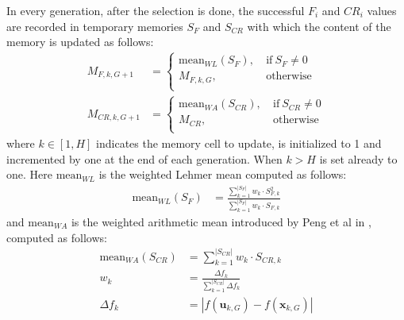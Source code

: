 In every generation, after the selection is done, the successful $F_{i}$ and $\textit{CR}_{i}$ values are recorded in temporary memories $S_{F}$ and $S_{\textit{CR}}$ with which the content of the memory is updated as follows:
\begin{align}
	M_{F,k,G+1} &= \begin{cases}
		\textrm{mean}_{\textit{WL}}(S_{F}),&\ \textrm{if}\ S_{F} \neq 0 \\
		M_{F,k,G},&\ \textrm{otherwise} \\
	\end{cases}\\
	M_{\textit{CR}, k, G + 1} &= \begin{cases}
		\textrm{mean}_{\textit{WA}}(S_{\textit{CR}}),&\ \textrm{if}\ S_{\textit{CR}} \neq 0 \\
		M_{\textit{CR}},&\ \textrm{otherwise} \\
	\end{cases}
\end{align}
where $k \in [1, H]$ indicates the memory cell to update, is initialized to 1 and incremented by one at the end of each generation. When $k > H$ is set already to one. Here $\textrm{mean}_{\textit{WL}}$ is the weighted Lehmer mean computed as follows:
\begin{align}
	\textrm{mean}_{\textit{WL}}(S_{F}) &= \frac{\sum_{k=1}^{|S_{F}|}w_{k} \cdot S_{F,k}^2}{\sum_{k=1}^{|S_{F}|}w_{k} \cdot S_{F,k}}
\end{align}
and $\textrm{mean}_{\textit{WA}}$ is the weighted arithmetic mean introduced by Peng et al in \cite{MSJADE:2009}, computed as follows:
\begin{align}
	\textrm{mean}_{\textit{WA}}(S_{\textit{CR}}) &= \sum\limits_{k=1}^{|S_{\textit{CR}}|}w_{k}\cdot S_{\textit{CR},k} \\
	w_k &= \frac{\Delta f_{k}}{\sum_{k=1}^{|S_{\textit{CR}}|}\Delta f_{k}} \\
	\Delta f_{k} &= |f(\textbf{u}_{k,G}) - f(\textbf{x}_{k,G})|
\end{align}

